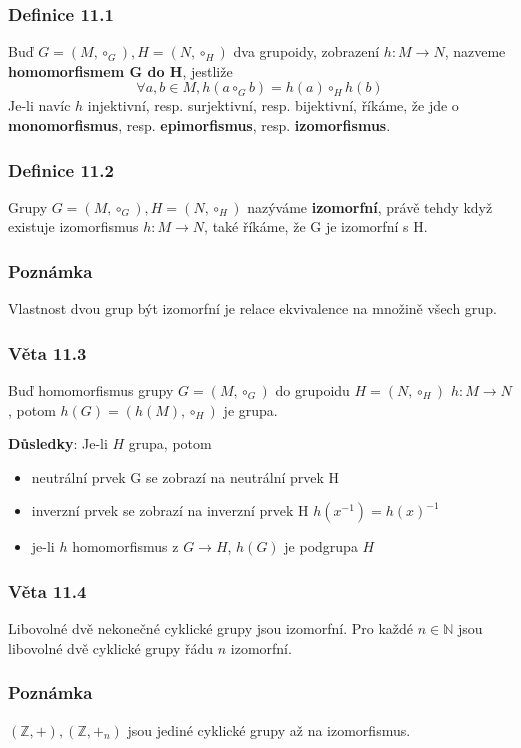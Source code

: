 \documentclass[12pt, letterpaper]{article}
\begin{document}
\subsubsection*{Definice 11.1}
Buď $G = (M, \circ_G), H = (N, \circ_H)$ dva grupoidy,
zobrazení $h: M \to N$, nazveme \textbf{homomorfismem G do H}, jestliže
\[ \forall a,b \in M, h(a \circ_G b) = h(a) \circ_H h(b)\]
Je-li navíc $h$ injektivní, resp. surjektivní, resp. bijektivní, říkáme,
že jde o \textbf{monomorfismus}, resp. \textbf{epimorfismus}, resp. \textbf{izomorfismus}.

\subsubsection*{Definice 11.2}
Grupy $G = (M, \circ_G), H = (N, \circ_H)$ nazýváme \textbf{izomorfní},
 právě tehdy když existuje izomorfismus $h: M \to N$, také říkáme, že G je izomorfní s H.

\subsubsection*{Poznámka}
Vlastnost dvou grup být izomorfní je relace ekvivalence na množině všech grup.

\subsubsection*{Věta 11.3}
Buď homomorfismus grupy $G = (M, \circ_G)$ do grupoidu $H = (N, \circ_H)$ $h: M \to N$,
potom $h(G) = (h(M), \circ_H)$ je grupa.

\textbf{Důsledky}: Je-li $H$ grupa, potom
\begin{itemize}
    \item neutrální prvek G se zobrazí na neutrální prvek H
    \item inverzní prvek se zobrazí na inverzní prvek H $h(x^{-1}) = h(x)^{-1}$
    \item je-li $h$ homomorfismus z $G \to H$, $h(G)$ je podgrupa $H$
\end{itemize}

\subsubsection*{Věta 11.4}
Libovolné dvě nekonečné cyklické grupy jsou izomorfní.
Pro každé $n \in \mathbb{N}$ jsou libovolné dvě cyklické grupy řádu $n$ izomorfní.

\subsubsection*{Poznámka}
$(\mathbb{Z},+), (\mathbb{Z},+_n)$ jsou jediné cyklické grupy až na izomorfismus.
\end{document}
